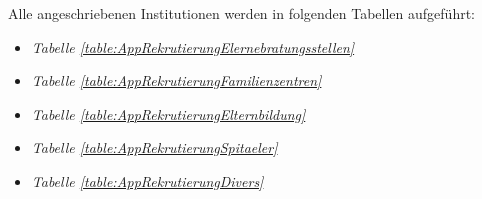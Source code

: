Alle angeschriebenen Institutionen werden in folgenden Tabellen aufgeführt:
\begin{itemize}
    \item \textit{Tabelle \ref{table:AppRekrutierungElernebratungsstellen} }
    
    \item \textit{Tabelle \ref{table:AppRekrutierungFamilienzentren} }
    
    \item \textit{Tabelle \ref{table:AppRekrutierungElternbildung} }
    
    \item \textit{Tabelle \ref{table:AppRekrutierungSpitaeler} }
    
    \item \textit{Tabelle \ref{table:AppRekrutierungDivers} }
\end{itemize}


